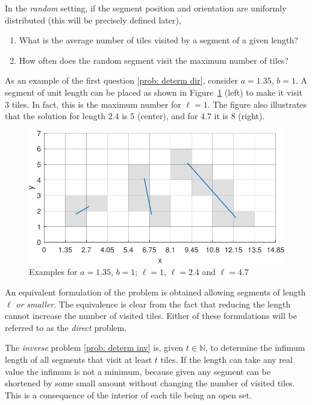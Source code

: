 \documentclass[12pt, a4paper]{article}
\makeatletter
\newcommand{\len}{\ell} %
\newcommand{\tiles}{t} %
\renewcommand\theenumi{(\@roman\c@enumi)} %
\renewcommand\labelenumi{\theenumi} %
\makeatother
\begin{document}
In the \emph{random} setting, if the segment position and orientation are uniformly distributed (this will be precisely defined later),
\begin{enumerate}
\renewcommand{\labelenumi}{(2\alph{enumi})}
\renewcommand{\theenumi}{(2\alph{enumi})}
\item
\label{prob: rand ave}
What is the average number of tiles visited by a segment of a given length?
\item
\label{prob: rand prob}
How often does the random segment visit the maximum number of tiles?
\end{enumerate}

As an example of the first question \ref{prob: determ dir}, consider $a=1.35$, $b=1$. A segment of unit length can be placed as shown in Figure~\ref{fig: examples} (left) to make it visit $3$ tiles. In fact, this is the maximum number for $\len=1$. The figure also illustrates that the solution for length $2.4$ is $5$ (center), and for $4.7$ it is $8$ (right).

\begin{figure}
\centering%
\includegraphics[width=.85\textwidth]{examples_1p35}%
\caption{Examples for $a=1.35$, $b=1$; $\len=1$, $\len=2.4$ and $\len=4.7$
}%
\label{fig: examples}%
\end{figure}%

An equivalent formulation of the problem is obtained allowing segments of length $\len$ \emph{or smaller}. The equivalence is clear from the fact that reducing the length cannot increase the number of visited tiles. Either of these formulations will be referred to as the \emph{direct} problem.

The \emph{inverse} problem \ref{prob: determ inv} is, given $\tiles \in \mathbb N$, to determine the infimum length of all segments that visit at least $\tiles$ tiles. If the length can take any real value the infimum is not a minimum, because given any segment can be shortened by some small amount without changing the number of visited tiles. This is a consequence of the interior of each tile being an open set.
\end{document}
